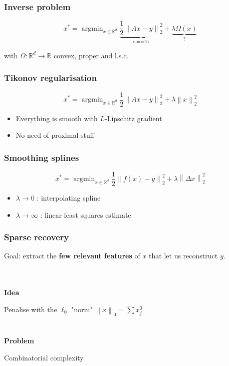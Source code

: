\documentclass[aspectratio=169]{beamer}
\newcommand{\RR}{\mathbb{R}}
\newcommand{\rd}{\mathbb{R}^d}
\newcommand{\norm}[1]{\left\|#1\right\|}
\newcommand{\normtwosq}[1]{\left\|#1\right\|_2^2}
\newcommand{\onehalf}{\frac{1}{2}}
\DeclareMathOperator*{\argmin}{argmin}
\begin{document}
		\begin{frame}
		\frametitle{Inverse problem}
		\begin{equation}
		\nonumber
		x^* = \argmin_{x\in \rd}\underbrace{\onehalf\normtwosq{Ax-y}}_{\text{smooth}} + \underbrace{\lambda \Omega(x)}_{\text{?}}
		\end{equation}
		\begin{center}
		with $\Omega:\rd\to\RR$ convex, proper and l.s.c.
		\end{center}
		\end{frame}
		
		\begin{frame}
		\frametitle{Tikonov regularisation}
		\begin{equation}
		\nonumber x^* = \argmin_{x\in \rd}\onehalf\normtwosq{Ax-y} + \lambda\norm{x}_2^2
		\end{equation}
		\begin{itemize}
		\item Everything is smooth with $L$-Lipschitz gradient
		\item No need of proximal stuff
		\end{itemize}
		\end{frame}
		
		\begin{frame}
		\frametitle{Smoothing splines}
		\begin{equation}
		\nonumber x^* = \argmin_{x\in \rd}\onehalf\normtwosq{f(x)-y} + \lambda\norm{\Delta x}_2^2
		\end{equation}
		\begin{itemize}
		\item $\lambda\to 0$ : interpolating spline
		\item $\lambda\to\infty$ : linear least squares estimate
		\end{itemize}
		\end{frame}
		
		
		\begin{frame}
		\frametitle{Sparse recovery}
		\begin{center}
		Goal: extract the \textbf{few relevant features} of $x$ that let us reconstruct $y$.
		\quad \\ \quad \\ \quad \\
		\pause

		\textbf{Idea}
		
		Penalise with the $\ell_0$ "norm" $\norm{x}_0 = \sum x_j^0$
		\pause
		\quad \\ \quad \\ \quad \\
		\textbf{Problem}
		
		Combinatorial complexity
		\end{center}
		\end{frame}
		
\end{document}
